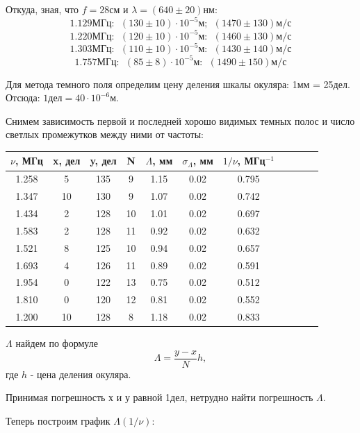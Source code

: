 \documentclass[14pt]{article}
\begin{document}
Откуда, зная, что $f = 28$см и $\lambda = (640 \pm 20)$нм:
$$
	1.129 \text{МГц}:~~(130 \pm 10)\cdot10^{-5}\text{м};~~(1470\pm130)\text{м/с}
$$
$$
	1.220 \text{МГц}:~~(120 \pm 10)\cdot10^{-5}\text{м}:~~(1460\pm130)\text{м/с}
$$
$$
	1.303 \text{МГц}:~~(110 \pm 10)\cdot10^{-5}\text{м}:~~(1430\pm140)\text{м/с}
$$
$$
	1.757 \text{МГц}:~~  (85 \pm 8)\cdot10^{-5}\text{м}:~~(1490\pm150)\text{м/с}
$$

\vspace{1cm}
Для метода темного поля определим цену деления шкалы окуляра: 1мм = 25дел. Отсюда: $1 \text{дел} = 40\cdot10^{-6}\text{м}$.

Снимем зависимость первой и последней хорошо видимых темных полос и число светлых промежутков между ними от частоты:

\begin{center}
\begin{tabular}{|c|c|c|c|c|c|c|c|c|c|c|}
\hline
$\nu$, МГц	&	x, дел	&	y, дел	&	N	&	$\Lambda$, мм	&	$\sigma_\Lambda$, мм	&	$1/\nu$, МГц$^{-1}$	\\
\hline
1.258		&	5		&	135		&	9	&	1.15			&	0.02					&	0.795				\\
\hline
1.347		&	10		&	130		&	9	&	1.07			&	0.02					&	0.742				\\
\hline
1.434		&	2		&	128		&	10	&	1.01			&	0.02					&	0.697				\\
\hline
1.583		&	2		&	128		&	11	&	0.92			&	0.02					&	0.632				\\
\hline
1.521		&	8		&	125		&	10	&	0.94			&	0.02					&	0.657				\\
\hline
1.693		&	4		&	126		&	11	&	0.89			&	0.02					&	0.591				\\
\hline
1.954		&	0		&	122		&	13	&	0.75			&	0.02					&	0.512				\\
\hline
1.810		&	0		&	120		&	12	&	0.81			&	0.02					&	0.552				\\
\hline
1.200		&	10		&	128		&	8	&	1.18			&	0.02					&	0.833				\\
\hline
\end{tabular}
\end{center}

$\Lambda$ найдем по формуле
$$
	\Lambda = \frac{y-x}{N}h,
$$
\noindent где $h$ - цена деления окуляра.

Принимая погрешность х и у равной 1дел, нетрудно найти погрешность $\Lambda$.

Теперь построим график $\Lambda(1/\nu)$:
\end{document}
